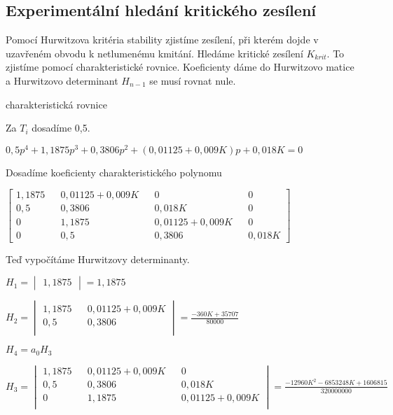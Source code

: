 \documentclass{article}
\begin{document}
		\subsection{Experimentální hledání kritického zesílení}
			Pomocí Hurwitzova kritéria stability zjistíme zesílení, při kterém dojde v uzavřeném obvodu k netlumenému kmitání. Hledáme kritické zesílení $K_{krit}$. To zjistíme pomocí charakteristické rovnice. Koeficienty dáme do Hurwitzovo matice a Hurwitzovo determinant $H_{n-1}$ se musí rovnat nule.
			\begin{center}
			charakteristická rovnice
			
			Za $T_i$ dosadíme 0,5. 
			
			\bigskip
			
			$0,5p^4+1,1875p^3+0,3806p^2+(0,01125+0,009K)p+0,018K=0$
			
			
			\bigskip
			
			Dosadíme koeficienty charakteristického polynomu
			
			\bigskip
			
			$\begin{bmatrix}
			1,1875 && 0,01125+0,009K && 0 && 0 \\
			0,5 && 0,3806 && 0,018K && 0 \\
			0 && 1,1875 && 0,01125+0,009K && 0 \\
			0 && 0,5 && 0,3806 && 0,018K
			\end{bmatrix}$
			
			\bigskip
			
			Teď vypočítáme Hurwitzovy determinanty.
			
			\bigskip
			
			$H_1=\begin{vmatrix}
			1,1875
			\end{vmatrix}=1,1875$
		
			\bigskip
			
			$H_2=\begin{vmatrix}
			1,1875 && 0,01125+0,009K\\
			0,5 && 0,3806 \\
			\end{vmatrix}=\frac{-360K+35707}{80000}$
		
			\bigskip
			
			$H_4=a_0H_3$
			
			\bigskip
			
			$H_3=\begin{vmatrix}
			1,1875 && 0,01125+0,009K && 0\\
			0,5 && 0,3806 && 0,018K\\
			0 && 1,1875 && 0,01125+0,009K \\
			\end{vmatrix}=\frac{-12960K^2-6853248K+1606815}{320000000}$
			

\end{center}
\end{document}
